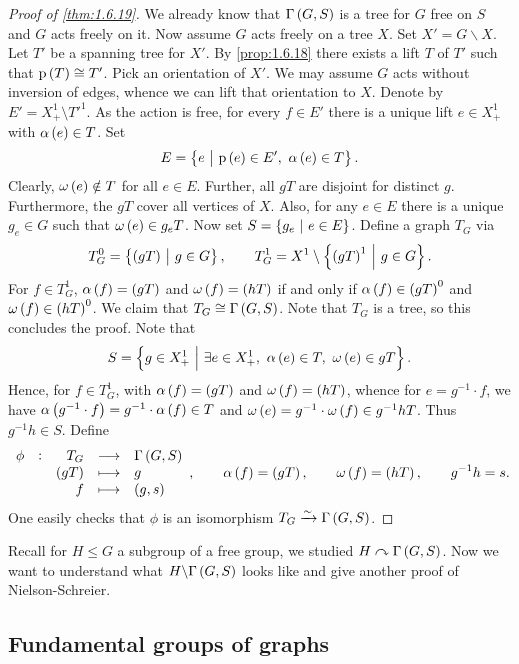 \begin{proof}[Proof of \ref{thm:1.6.19}]
We already know that $ \Gamma\br{G, S} $ is a tree for $ G $ free on $ S $ and $ G $ acts freely on it. Now assume $ G $ acts freely on a tree $ X $. Set $ X' = G \backslash X $. Let $ T' $ be a spanning tree for $ X' $. By \ref{prop:1.6.18} there exists a lift $ T $ of $ T' $ such that $ \p\br{T} \cong T' $. Pick an orientation of $ X' $. We may assume $ G $ acts without inversion of edges, whence we can lift that orientation to $ X $. Denote by $ E' = X_+^1 \setminus T'^1 $. As the action is free, for every $ f \in E' $ there is a unique lift $ e \in X_+^1 $ with $ \alpha\br{e} \in T $. Set
$$ E = \cbr{e \st \p\br{e} \in E', \ \alpha\br{e} \in T}. $$
Clearly, $ \omega\br{e} \notin T $ for all $ e \in E $. Further, all $ gT $ are disjoint for distinct $ g $. Furthermore, the $ gT $ cover all vertices of $ X $. Also, for any $ e \in E $ there is a unique $ g_e \in G $ such that $ \omega\br{e} \in g_eT $. Now set $ S = \cbr{g_e \st e \in E} $. Define a graph $ T_G $ via
$$ T_G^0 = \cbr{\br{gT} \st g \in G}, \qquad T_G^1 = X^1 \setminus \cbr{\br{gT}^1 \st g \in G}. $$
For $ f \in T_G^1 $, $ \alpha\br{f} = \br{gT} $ and $ \omega\br{f} = \br{hT} $ if and only if $ \alpha\br{f} \in \br{gT}^0 $ and $ \omega\br{f} \in \br{hT}^0 $. We claim that $ T_G \cong \Gamma\br{G, S} $. Note that $ T_G $ is a tree, so this concludes the proof. Note that
$$ S = \cbr{g \in X_+^1 \st \exists e \in X_+^1, \ \alpha\br{e} \in T, \ \omega\br{e} \in gT}. $$
Hence, for $ f \in T_G^1 $, with $ \alpha\br{f} = \br{gT} $ and $ \omega\br{f} = \br{hT} $, whence for $ e = g^{-1} \cdot f $, we have $ \alpha\br{g^{-1} \cdot f} = g^{-1} \cdot \alpha\br{f} \in T $ and $ \omega\br{e} = g^{-1} \cdot \omega\br{f} \in g^{-1}hT $. Thus $ g^{-1}h \in S $. Define
$$ \functions[\phi]{T_G}{\Gamma\br{G, S}}{\br{gT}}{g}{f}{\br{g, s}}, \qquad \alpha\br{f} = \br{gT}, \qquad \omega\br{f} = \br{hT}, \qquad g^{-1}h = s. $$
One easily checks that $ \phi $ is an isomorphism $ T_G \xrightarrow{\sim} \Gamma\br{G, S} $.
\end{proof}

Recall for $ H \le G $ a subgroup of a free group, we studied $ H \curvearrowright \Gamma\br{G, S} $. Now we want to understand what $ H \backslash \Gamma\br{G, S} $ looks like and give another proof of Nielson-Schreier.

\subsection{Fundamental groups of graphs}

